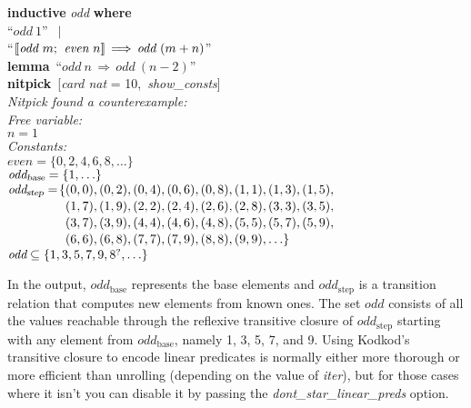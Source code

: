 \documentclass[a4paper,12pt]{article}
\def\unr{\ldots}
\def\Q{{\smash{\lower.2ex\hbox{$\scriptstyle?$}}}}
\begin{document}
\prew
\textbf{inductive} \textit{odd} \textbf{where} \\
``$\textit{odd}~1$'' $\,\mid$ \\
``$\mathopen{[\![} \textit{odd}~m;\>\, \textit{even}~n\mathclose{]\!]} \,\Longrightarrow\, \textit{odd}~(m + n)$'' \\[2\smallskipamount]
\textbf{lemma}~``$\textit{odd}~n \,\Longrightarrow\, \textit{odd}~(n - 2)$'' \\
\textbf{nitpick}~[\textit{card nat} = 10,\, \textit{show\_consts}] \\[2\smallskipamount]
\slshape Nitpick found a counterexample:
\\[2\smallskipamount]
\hbox{}\qquad Free variable: \nopagebreak \\
\hbox{}\qquad\qquad $n = 1$ \\
\hbox{}\qquad Constants: \nopagebreak \\
\hbox{}\qquad\qquad $\textit{even} = \{0, 2, 4, 6, 8, \unr\}$ \\
\hbox{}\qquad\qquad $\textit{odd}_{\textsl{base}} = \{1, \unr\}$ \\
\hbox{}\qquad\qquad $\textit{odd}_{\textsl{step}} = \!
\!\begin{aligned}[t]
  & \{(0, 0), (0, 2), (0, 4), (0, 6), (0, 8), (1, 1), (1, 3), (1, 5), \\[-2pt]
  & \phantom{\{} (1, 7), (1, 9), (2, 2), (2, 4), (2, 6), (2, 8), (3, 3),
       (3, 5), \\[-2pt]
  & \phantom{\{} (3, 7), (3, 9), (4, 4), (4, 6), (4, 8), (5, 5), (5, 7), (5, 9), \\[-2pt]
  & \phantom{\{} (6, 6), (6, 8), (7, 7), (7, 9), (8, 8), (9, 9), \unr\}\end{aligned}$ \\
\hbox{}\qquad\qquad $\textit{odd} \subseteq \{1, 3, 5, 7, 9, 8^\Q, \unr\}$
\postw

\noindent
In the output, $\textit{odd}_{\textrm{base}}$ represents the base elements and
$\textit{odd}_{\textrm{step}}$ is a transition relation that computes new
elements from known ones. The set $\textit{odd}$ consists of all the values
reachable through the reflexive transitive closure of
$\textit{odd}_{\textrm{step}}$ starting with any element from
$\textit{odd}_{\textrm{base}}$, namely 1, 3, 5, 7, and 9. Using Kodkod's
transitive closure to encode linear predicates is normally either more thorough
or more efficient than unrolling (depending on the value of \textit{iter}), but
for those cases where it isn't you can disable it by passing the
\textit{dont\_star\_linear\_preds} option.
\end{document}
